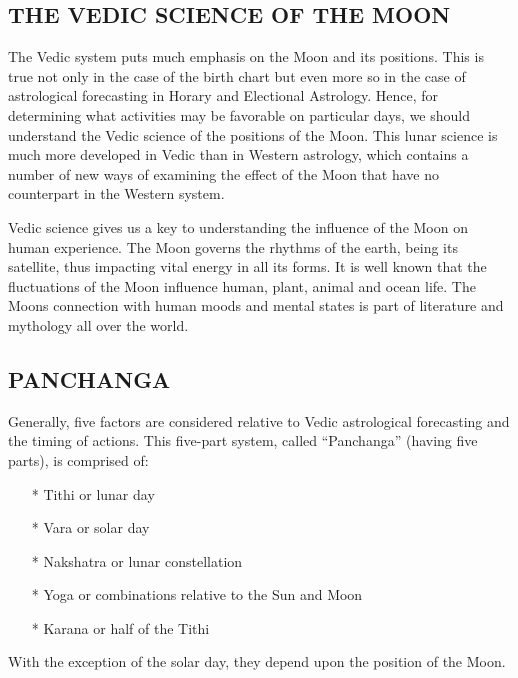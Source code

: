  

\subsection{THE VEDIC SCIENCE OF THE MOON}

 

The Vedic system puts much emphasis on the Moon and its positions. This is true not only in the case of the birth chart but even more so in the case of astrological forecasting in Horary and Electional Astrology. Hence, for determining what activities may be favorable on particular days, we should understand the Vedic science of the positions of the Moon. This lunar science is much more developed in Vedic than in Western astrology, which contains a number of new ways of examining the effect of the Moon that have no counterpart in the Western system.

 

Vedic science gives us a key to understanding the influence of the Moon on human experience. The Moon governs the rhythms of the earth, being its satellite, thus impacting vital energy in all its forms. It is well known that the fluctuations of the Moon influence human, plant, animal and ocean life. The Moons connection with human moods and mental states is part of literature and mythology all over the world.

 

\subsection{PANCHANGA}

 

Generally, five factors are considered relative to Vedic astrological forecasting and the timing of actions. This five-part system, called “Panchanga” (having five parts), is comprised of:

 
\begin{enumerate}
\item[*] Tithi or lunar day
\item[*] Vara or solar day
\item[*] Nakshatra or lunar constellation
\item[*] Yoga or combinations relative to the Sun and Moon
\item[*] Karana or half of the Tithi
\end{enumerate}

With the exception of the solar day, they depend upon the position of the Moon.

